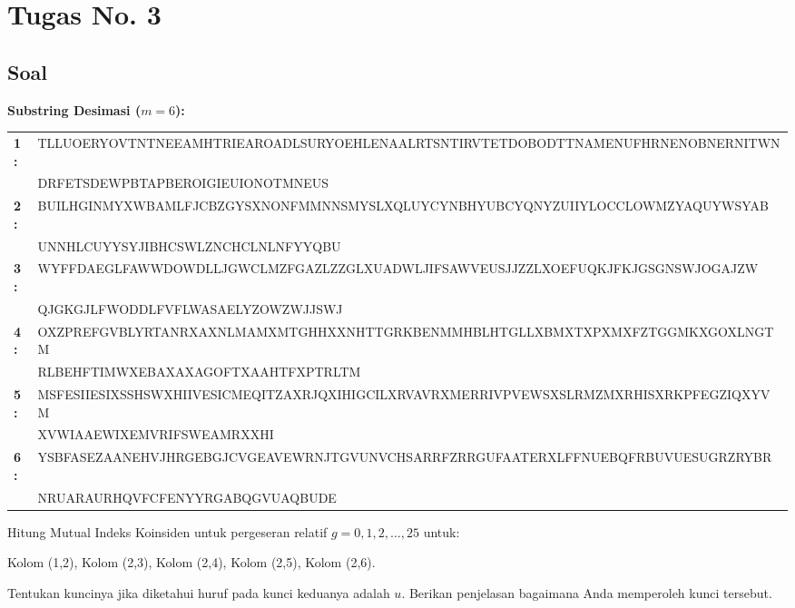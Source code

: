 \documentclass[11pt,a4paper]{article}
\begin{document}
\newpage

\section*{Tugas No. 3}

\subsection*{Soal}
\begin{tcolorbox}[title=Soal 3]
\textbf{Substring Desimasi ($m=6$):}
\begin{center}
\ttfamily\footnotesize
\begin{tabular}{l l}
\textbf{1:} & TLLUOERYOVTNTNEEAMHTRIEAROADLSURYOEHLENAALRTSNTIRVTETDOBODTTNAMENUFHRNENOBNERNITWN \\
            & DRFETSDEWPBTAPBEROIGIEUIONOTMNEUS \\[0.1cm]
\textbf{2:} & BUILHGINMYXWBAMLFJCBZGYSXNONFMMNNSMYSLXQLUYCYNBHYUBCYQNYZUIIYLOCCLOWMZYAQUYWSYAB \\
            & UNNHLCUYYSYJIBHCSWLZNCHCLNLNFYYQBU \\[0.1cm]
\textbf{3:} & WYFFDAEGLFAWWDOWDLLJGWCLMZFGAZLZZGLXUADWLJIFSAWVEUSJJZZLXOEFUQKJFKJGSGNSWJOGAJZW \\
            & QJGKGJLFWODDLFVFLWASAELYZOWZWJJSWJ \\[0.1cm]
\textbf{4:} & OXZPREFGVBLYRTANRXAXNLMAMXMTGHHXXNHTTGRKBENMMHBLHTGLLXBMXTXPXMXFZTGGMKXGOXLNGTM \\
            & RLBEHFTIMWXEBAXAXAGOFTXAAHTFXPTRLTM \\[0.1cm]
\textbf{5:} & MSFESIIESIXSSHSWXHIIVESICMEQITZAXRJQXIHIGCILXRVAVRXMERRIVPVEWSXSLRMZMXRHISXRKPFEGZIQXYVM \\
            & XVWIAAEWIXEMVRIFSWEAMRXXHI \\[0.1cm]
\textbf{6:} & YSBFASEZAANEHVJHRGEBGJCVGEAVEWRNJTGVUNVCHSARRFZRRGUFAATERXLFFNUEBQFRBUVUESUGRZRYBR \\
            & NRUARAURHQVFCFENYYRGABQGVUAQBUDE
\end{tabular}
\end{center}

\vspace{0.2cm}
Hitung Mutual Indeks Koinsiden untuk pergeseran relatif $g=0,1,2,\dots,25$ untuk:
\begin{center}
Kolom (1,2), Kolom (2,3), Kolom (2,4), Kolom (2,5), Kolom (2,6).
\end{center}
Tentukan kuncinya jika diketahui huruf pada kunci keduanya adalah $u$. Berikan penjelasan bagaimana Anda memperoleh kunci tersebut.
\end{tcolorbox}
\end{document}
